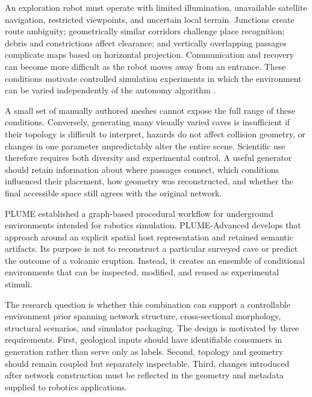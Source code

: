 \documentclass[conference]{IEEEtran}
\begin{document}
An exploration robot must operate with limited illumination, unavailable satellite navigation, restricted viewpoints, and uncertain local terrain. Junctions create route ambiguity; geometrically similar corridors challenge place recognition; debris and constrictions affect clearance; and vertically overlapping passages complicate maps based on horizontal projection. Communication and recovery can become more difficult as the robot moves away from an entrance. These conditions motivate controlled simulation experiments in which the environment can be varied independently of the autonomy algorithm \cite{cano_navigation,daedalus2021}.

A small set of manually authored meshes cannot expose the full range of these conditions. Conversely, generating many visually varied caves is insufficient if their topology is difficult to interpret, hazards do not affect collision geometry, or changes in one parameter unpredictably alter the entire scene. Scientific use therefore requires both diversity and experimental control. A useful generator should retain information about where passages connect, which conditions influenced their placement, how geometry was reconstructed, and whether the final accessible space still agrees with the original network.

PLUME \cite{plume2025} established a graph-based procedural workflow for underground environments intended for robotics simulation. PLUME-Advanced develops that approach around an explicit spatial host representation and retained semantic artifacts. Its purpose is not to reconstruct a particular surveyed cave or predict the outcome of a volcanic eruption. Instead, it creates an ensemble of conditional environments that can be inspected, modified, and reused as experimental stimuli.

The research question is whether this combination can support a controllable environment prior spanning network structure, cross-sectional morphology, structural scenarios, and simulator packaging. The design is motivated by three requirements. First, geological inputs should have identifiable consumers in generation rather than serve only as labels. Second, topology and geometry should remain coupled but separately inspectable. Third, changes introduced after network construction must be reflected in the geometry and metadata supplied to robotics applications.
\end{document}
